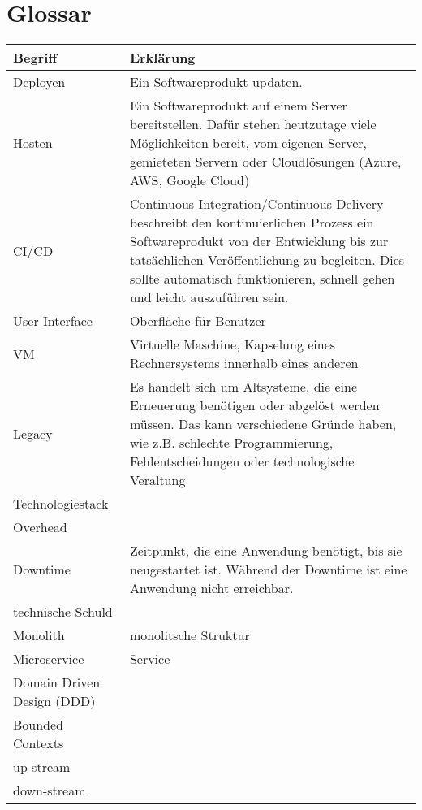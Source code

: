 \section{Glossar}
\begin{center}
	\begin{tabular}{lp{10cm}}
		Begriff & Erklärung \\ \hline
		Deployen & Ein Softwareprodukt updaten.  \\
		Hosten & Ein Softwareprodukt auf einem Server bereitstellen. Dafür stehen heutzutage viele Möglichkeiten bereit, vom eigenen Server, gemieteten Servern oder Cloudlösungen (Azure, AWS, Google Cloud) \\
		CI/CD & Continuous Integration/Continuous Delivery beschreibt den kontinuierlichen Prozess ein Softwareprodukt von der Entwicklung bis zur tatsächlichen Veröffentlichung zu begleiten. Dies sollte automatisch funktionieren, schnell gehen und leicht auszuführen sein.  \\
		User Interface  & Oberfläche für Benutzer  \\
		VM & Virtuelle Maschine, Kapselung eines Rechnersystems innerhalb eines anderen  \\
		Legacy & Es handelt sich um Altsysteme, die eine Erneuerung benötigen oder abgelöst werden müssen. Das kann verschiedene Gründe haben, wie z.B. schlechte Programmierung, Fehlentscheidungen oder technologische Veraltung   \\
		Technologiestack &   \\
		Overhead &   \\
		Downtime & Zeitpunkt, die eine Anwendung benötigt, bis sie neugestartet ist. Während der Downtime ist eine Anwendung nicht erreichbar.  \\
		technische Schuld &   \\
		Monolith & monolitsche Struktur \\
		Microservice & Service  \\	
		Domain Driven Design (DDD) &  \\	
		Bounded Contexts & \\
		up-stream & \\
		down-stream & \\
	\end{tabular}
\end{center}